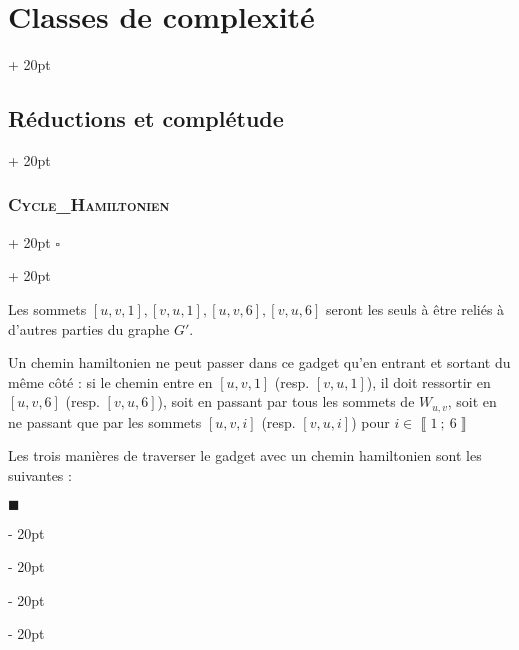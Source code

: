 \documentclass[a4paper, 12pt, twoside]{article}
\newcommand{\nset}[2]{\left\llbracket #1\ ;\ #2 \right\rrbracket}
\newcommand{\ind}[1][20pt]{\advance\leftskip + #1}
\newcommand{\deind}[1][20pt]{\advance\leftskip - #1}
\newenvironment{indt}[2][20pt]{#2 \par \ind[#1]}{\par \deind} %
\newenvironment{proof}[1][{}]{\begin{indt}{$\square$ #1}}{$\blacksquare$ \end{indt}}
\begin{document}
\begin{indt}{\section{Classes de complexité}}
\begin{indt}{\subsection{Réductions et complétude}}
\begin{indt}{\subsubsection{\textsc{Cycle\_Hamiltonien}}}
\begin{proof}
\begin{center}
                    \end{center}

                    Les sommets $[u, v, 1], [v, u, 1], [u, v, 6], [v, u, 6]$ seront les seuls à être reliés à d'autres parties du graphe $G'$.

                    Un chemin hamiltonien ne peut passer dans ce gadget qu'en entrant et sortant du même côté : si le chemin entre en $[u, v, 1]$ (resp. $[v, u, 1]$), il doit ressortir en $[u, v, 6]$ (resp. $[v, u, 6]$), soit en passant par tous les sommets de $W_{u, v}$, soit en ne passant que par les sommets $[u, v, i]$ (resp. $[v, u, i]$) pour $i \in \nset 1 6$

                    Les trois manières de traverser le gadget avec un chemin hamiltonien sont les suivantes :

                    \begin{center}
\end{center}
\end{proof}
\end{indt}
\end{indt}
\end{indt}
\end{document}
